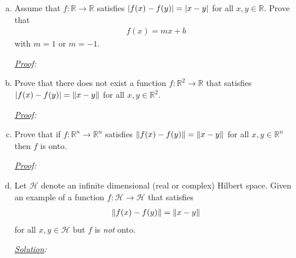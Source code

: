 \documentclass[11pt]{article}
\begin{document}
\begin{enumerate}[(a)]
	\item Assume that $f: \mathbb{R} \to \mathbb{R}$ satisfies $\abs{f(x) - f(y)} = \abs{x-y}$ for all $x,y\in \mathbb{R}$. Prove that 
	\begin{align*}
	f(x) = mx+b
	\end{align*}
	with $m=1$ or $m=-1$.
	
	\noindent \textit{\underline{Proof}:}
	
	
	
	
	
	
	
	\item Prove that there does not exist a function $f: \mathbb{R}^2 \to \mathbb{R}$ that satisfies $\abs{f(x) - f(y)} = \norm{x-y}$ for all $x,y\in \mathbb{R}^2$.
	
	
	
	\noindent \textit{\underline{Proof}:}
	
	
	\item Prove that if $f: \mathbb{R}^n \to \mathbb{R}^n$ satisfies $\norm{f(x) - f(y)} = \norm{x-y}$ for all $x,y\in \mathbb{R}^n$ then $f$ is onto.
	
	
	\noindent \textit{\underline{Proof}:}
	
	\item Let $\mathcal{H}$ denote an infinite dimensional (real or complex) Hilbert space. Given an example of a function $f: \mathcal{H} \to \mathcal{H}$ that satisfies 
	\begin{align*}
	\norm{f(x) - f(y)} = \norm{x-y}
	\end{align*} 
	for all $x,y\in \mathcal{H}$ but $f$ is \textit{not} onto. 
	
	
	
	
	\noindent \textit{\underline{Solution}:}
	
	
	
	
	
	
\end{enumerate}
\end{document}
